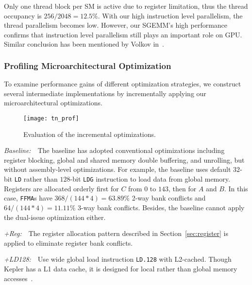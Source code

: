 
Only one thread block per SM is active due to register limitation, thus the thread occupancy is $256/2048=12.5\%$.
With our high instruction level parallelism, the thread parallelism becomes low.
However, our SGEMM's high performance confirms that instruction level parallelism still plays an important role on GPU.
Similar conclusion has been mentioned by Volkov in~\cite{volkov2010better}.

\subsubsection{Profiling Microarchitectural Optimization}

To examine performance gains of different optimization strategies, we construct several intermediate 
implementations by incrementally applying our microarchitectural optimizations.
\begin{figure}[htbp]
\begin{center}
\texttt{[image: tn\_prof]}
    \caption{\small Evaluation of the incremental optimizations.}
\label{fig:th_prof}
\end{center}
\end{figure}

{\it Baseline:}~~The baseline has adopted conventional optimizations including register blocking, global and shared memory double buffering, and unrolling, but without assembly-level optimizations.
For example, the baseline uses default $32$-bit {\tt LD} rather than $128$-bit {\tt LDG} instruction to load data from global memory.
Registers are allocated orderly first for $C$ from $0$ to $143$, then for $A$ and $B$. 
In this case, {\tt FFMA}s have $368/(144*4)=63.89\%$ 2-way bank conflicts and $64/(144*4)=11.11\%$ 3-way bank conflicts. 
Besides, the baseline cannot apply the dual-issue optimization either.

{\it +Reg:}~~The register allocation pattern described in Section~\ref{sec:register} is applied to eliminate register bank conflicts. 

{\it +LD128:}~~Use wide global load instruction {\tt LD.128} with L2-cached.
Though Kepler has a L1 data cache, it is designed for local rather than global memory accesses~\cite{gk110}.

